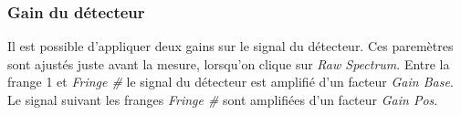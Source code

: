\documentclass[11pt,francais]{book} %
\begin{document}
\begin{table}
  \caption{Configuration du Bomem relative au détecteur}
  \label{table:configurationBomemDetecteur}
  \centering
\end{table}

\subsubsection{Gain du détecteur}

Il est possible d'appliquer deux gains sur le signal du détecteur.
Ces paremètres sont ajustés juste avant la mesure, lorsqu'on clique sur {\it Raw Spectrum}.
Entre la frange 1 et {\it Fringe \#} le signal du détecteur est amplifié d'un facteur {\it Gain Base}.
Le signal suivant les franges {\it Fringe \#} sont amplifiées d'un facteur {\it Gain Pos}.
\end{document}
